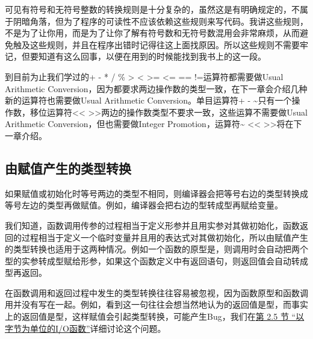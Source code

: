 可见有符号和无符号整数的转换规则是十分复杂的，虽然这是有明确规定的，不属于阴暗角落，但为了程序的可读性不应该依赖这些规则来写代码。我讲这些规则，不是为了让你用，而是为了让你了解有符号数和无符号数混用会非常麻烦，从而避免触及这些规则，并且在程序出错时记得往这上面找原因。所以这些规则不需要牢记，但要知道有这么回事，以便在用到的时候能找到我书上的这一段。



到目前为止我们学过的+ - * / \% \textgreater{} \textless{} \textgreater{}= \textless{}= == !=运算符都需要做Usual Arithmetic Conversion，因为都要求两边操作数的类型一致，在下一章会介绍几种新的运算符也需要做Usual Arithmetic Conversion。单目运算符+ - \textasciitilde{}只有一个操作数，移位运算符\textless{}\textless{} \textgreater{}\textgreater{}两边的操作数类型不要求一致，这些运算不需要做Usual Arithmetic Conversion，但也需要做Integer Promotion，运算符\textasciitilde{} \textless{}\textless{} \textgreater{}\textgreater{}将在下一章介绍。


\subsection{由赋值产生的类型转换}
%


如果赋值或初始化时等号两边的类型不相同，则编译器会把等号右边的类型转换成等号左边的类型再做赋值。例如，编译器会把右边的型转成型再赋给变量。



我们知道，函数调用传参的过程相当于定义形参并且用实参对其做初始化，函数返回的过程相当于定义一个临时变量并且用的表达式对其做初始化，所以由赋值产生的类型转换也适用于这两种情况。例如一个函数的原型是，则调用时会自动把两个型的实参转成型赋给形参，如果这个函数定义中有返回语句，则返回值会自动转成型再返回。



在函数调用和返回过程中发生的类型转换往往容易被忽视，因为函数原型和函数调用并没有写在一起。例如，看到这一句往往会想当然地认为的返回值是型，而事实上的返回值是型，这样赋值会引起类型转换，可能产生Bug，我们在\hyperlink{db.ch25s02.id2831236}{第 2.\BookSplit{}5 节 “以字节为单位的I/\BookSplit{}O函数”}详细讨论这个问题。


